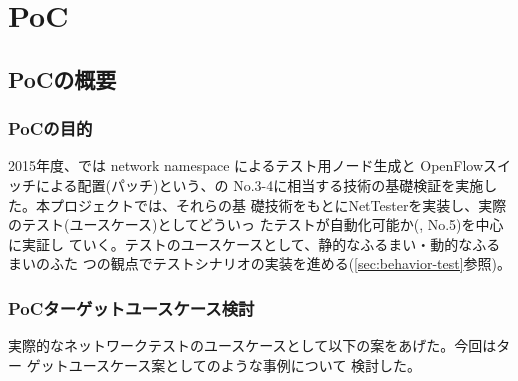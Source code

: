 
\chapter{PoC}
\label{chap:poc}

 \section{PoCの概要}
 \label{sec:poc-overview}



 \subsection{PoCの目的}
 \label{sec:poc-purpose}

2015年度、\lopjc では network namespace によるテスト用ノード生成と
OpenFlowスイッチによる配置(パッチ)という、の
No.3-4に相当する技術の基礎検証を実施した。本プロジェクトでは、それらの基
礎技術をもとにNetTesterを実装し、実際のテスト(ユースケース)としてどういっ
たテストが自動化可能か(, No.5)を中心に実証し
ていく。テストのユースケースとして、静的なふるまい・動的なふるまいのふた
つの観点でテストシナリオの実装を進める(\ref{sec:behavior-test}参照)。

  \subsection{PoCターゲットユースケース検討}
  \label{sec:poc-usecase-discuss}

実際的なネットワークテストのユースケースとして以下の案をあげた。今回はター
ゲットユースケース案としてのような事例について
検討した。


